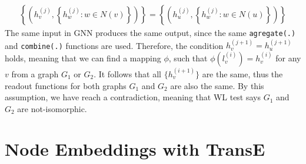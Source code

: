 \documentclass{article}
\begin{document}
{\begin{align*}
    \left\{ \left( h_v^{(j)}, \left\{ h_w^{(j)}: w \in N(v) \right\}\right)\right\} = \left\{ \left( h_u^{(j)}, \left\{ h_w^{(j)}: w \in N(u) \right\}\right)\right\}
  \end{align*}
  The same input in GNN produces the same output, since the same \texttt{agregate(.)} and \texttt{combine(.)} functions are used. 
  Therefore, the condition $h_v^{(j + 1)} = h_u^{(j + 1)}$ holds, meaning that we can find a mapping $\phi$, such that $\phi(l_v^{(i)}) = h_v^{(i)}$ for any $v$ from a graph $G_1$ or $G_2$.
  It follows that all $\{h_v^{(i + 1)}\}$ are the same, thus the readout functions for both graphs $G_1$ and $G_2$ are also the same.
  By this assumption, we have reach a contradiction, meaning that WL test says $G_1$ and $G_2$ are not-isomorphic.


}




\section{Node Embeddings with TransE}
\end{document}

